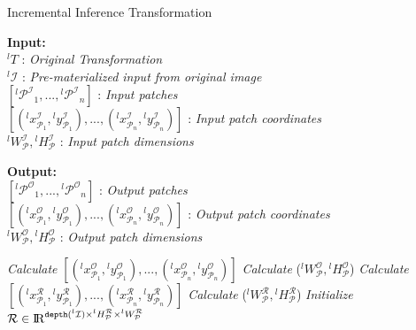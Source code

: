 \begin{algorithm}
    \caption{Incremental Inference Transformation}\label{euclid}
    \label{alg:incinference}
    \begin{flushleft}
     \hspace*{1mm} \textbf{Input:} \\
     \hspace*{3mm} $^lT$ : \textit{Original Transformation}\\
     \hspace*{3mm} $^l\mathcal{I}$ : \textit{Pre-materialized input from original image}\\
     \hspace*{3mm} $[^l\mathcal{P^I}_1,...,{}^{l}\mathcal{P^I}_n]$ : \textit{Input patches}\\
     \hspace*{3mm} $[(^lx^\mathcal{I}_{\mathcal{P}_1},{}^ly^\mathcal{I}_{\mathcal{P}_1}),...,({}^lx^\mathcal{I}_{\mathcal{P}_n},{}^ly^\mathcal{I}_{\mathcal{P}_n})]$ : \textit{Input patch coordinates}\\
     \hspace*{3mm} $^lW^\mathcal{I}_\mathcal{P},{}^lH^\mathcal{I}_\mathcal{P}$ : \textit{Input patch dimensions}
    \end{flushleft}

	\begin{flushleft}
     \hspace*{1mm} \textbf{Output:}\\
     \hspace*{3mm} $[^l\mathcal{P^O}_1,...,{}^{l}\mathcal{P^O}_n]$ : \textit{Output patches}\\
     \hspace*{3mm} $[(^lx^\mathcal{O}_{\mathcal{P}_1},{}^ly^\mathcal{O}_{\mathcal{P}_1}),...,({}^lx^\mathcal{O}_{\mathcal{P}_n},{}^ly^\mathcal{O}_{\mathcal{P}_n})]$ : \textit{Output patch coordinates}\\
     \hspace*{3mm} $^lW^\mathcal{O}_\mathcal{P},{}^lH^\mathcal{O}_\mathcal{P}$ : \textit{Output patch dimensions}
    \end{flushleft}

    \begin{algorithmic}[1]
    \State \textit{Calculate} $[(^lx^\mathcal{O}_{\mathcal{P}_1},{}^ly^\mathcal{O}_{\mathcal{P}_1}),...,({}^lx^\mathcal{O}_{\mathcal{P}_n},{}^ly^\mathcal{O}_{\mathcal{P}_n})]$ 
    \State \textit{Calculate} ($^lW^\mathcal{O}_\mathcal{P},{}^lH^\mathcal{O}_\mathcal{P}$)
    \State \textit{Calculate} $[({}^lx^\mathcal{R}_{\mathcal{P}_1},{}^ly^\mathcal{R}_{\mathcal{P}_1}),...,({}^lx^\mathcal{R}_{\mathcal{P}_n},{}^ly^\mathcal{R}_{\mathcal{P}_n})]$
    \State \textit{Calculate} ($^lW^\mathcal{R}_\mathcal{P},{}^lH^\mathcal{R}_\mathcal{P}$)
    \State \textit{Initialize} $\mathcal{R} \in \mathcal{\rm I\!R}^{\texttt{depth}({}^l\mathcal{I}) \times {}^lH^\mathcal{R}_\mathcal{P} \times {}^lW^\mathcal{R}_\mathcal{P}}$


\end{algorithmic}
\end{algorithm}
